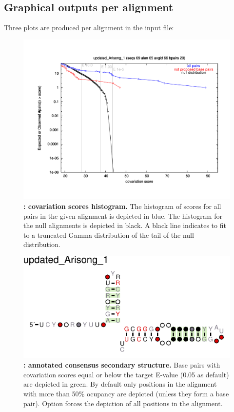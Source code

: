 \subsection{Graphical outputs per alignment}
Three plots are produced per alignment in the input file: 

\begin{figure}
  \includegraphics[scale=0.50]{Arisong_his.pdf} 
\caption{\small\textbf{:
    covariation scores histogram.}  The histogram of scores for all
  pairs in the given alignment is depicted in blue. The histogram for
  the null alignments is depicted in black. A black line indicates to
  fit to a truncated Gamma distribution of the tail of the null
  distribution.}
\label{fig:histogram}
\end{figure}

\begin{figure}
  \includegraphics[scale=1.5]{Arisong_R2R.pdf} 
\caption{\small\textbf{:
    annotated consensus secondary structure.} Base pairs with
  covariation scores equal or below the target E-value (0.05 as
  default) are depicted in green. By default only positions in the
  alignment with more than 50\% ocupancy are depicted (unless they form
  a base pair). Option  forces the depiction of all
  positions in the alignment.  }
\label{fig:r2r}
\end{figure}

